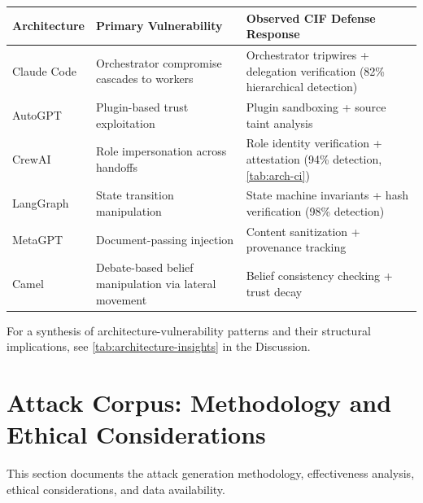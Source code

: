 \documentclass[
]{article}
\newcounter{none} %
\begin{document}
{\def\LTcaptype{none} %
\begin{longtable}[]{@{}
  >{\raggedright\arraybackslash}p{}
  >{\raggedright\arraybackslash}p{}
  >{\raggedright\arraybackslash}p{}@{}}
\toprule\noalign{}
\begin{minipage}[b]{\linewidth}\raggedright
Architecture
\end{minipage} & \begin{minipage}[b]{\linewidth}\raggedright
Primary Vulnerability
\end{minipage} & \begin{minipage}[b]{\linewidth}\raggedright
Observed CIF Defense Response
\end{minipage} \\
\midrule\noalign{}
\endhead
\bottomrule\noalign{}
\endlastfoot
Claude Code & Orchestrator compromise cascades to workers & Orchestrator
tripwires + delegation verification (82\% hierarchical detection) \\
AutoGPT & Plugin-based trust exploitation & Plugin sandboxing + source
taint analysis \\
CrewAI & Role impersonation across handoffs & Role identity verification
+ attestation (94\% detection, \cref{tab:arch-ci}) \\
LangGraph & State transition manipulation & State machine invariants +
hash verification (98\% detection) \\
MetaGPT & Document-passing injection & Content sanitization + provenance
tracking \\
Camel & Debate-based belief manipulation via lateral movement & Belief
consistency checking + trust decay \\
\end{longtable}
}

For a synthesis of architecture-vulnerability patterns and their
structural implications, see \cref{tab:architecture-insights} in the
Discussion.

\newpage

\newpage

\section{Attack Corpus: Methodology and Ethical
Considerations}\label{sec:attack-methodology}

This section documents the attack generation methodology, effectiveness
analysis, ethical considerations, and data availability.
\end{document}
